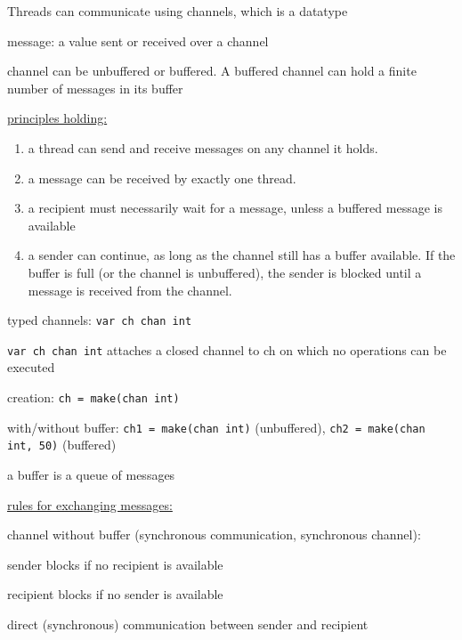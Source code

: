 \documentclass[landscape, a4paper]{article}
\begin{document}
\begin{minipage}[t]{0.2\linewidth}
	\begin{betterlist}
		\item Threads can communicate using channels, which is a datatype
		\item \alert{message:} a value sent or received over a channel
		\item channel can be \alert{unbuffered} or \alert{buffered}. A buffered channel can hold a finite number of messages in its buffer
		\item \underline{principles holding:}
		\begin{enumerate}
			\item a thread can send and receive messages on any channel it holds.
			\item a message can be received by exactly one thread.
			\item a recipient must necessarily wait for a message, unless a buffered message is available
			\item a sender can continue, as long as the channel still has a buffer available. If the buffer is full (or the channel is unbuffered), the sender is blocked until a message is received from the channel.
		\end{enumerate}
		\item \alert{typed channels:} \verb|var ch chan int|
		\begin{betterlist}
			\item \verb|var ch chan int| attaches a closed channel to ch on which no operations can be executed
		\end{betterlist}
		\item \alert{creation:} \verb|ch = make(chan int)|
		\item \alert{with/without buffer:} \verb|ch1 = make(chan int)| (unbuffered), \verb|ch2 = make(chan int, 50)| (buffered)
		\begin{betterlist}
			\item a buffer is a queue of messages
			\item \underline{rules for exchanging messages:}
			\begin{betterlist}
				\item channel without buffer (synchronous communication, synchronous channel):
				\begin{betterlist}
					\item sender blocks if no recipient is available
					\item recipient blocks if no sender is available
					\item direct (synchronous) communication between sender and recipient

\end{betterlist}
\end{betterlist}
\end{betterlist}
\end{betterlist}
\end{minipage}
\end{document}
